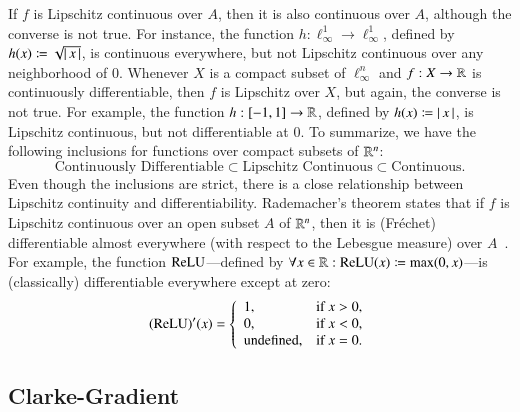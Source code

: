 \documentclass[11pt,times]{article}
\begin{document}
If $f$ is Lipschitz continuous over $A$, then it is also continuous
over $A$, although the converse is not true. For instance, the
function $h : \ell^1_\infty \to \ell^1_\infty$, defined by
$h(x) \coloneqq \sqrt{\lvert\thinspace {x} \thinspace\rvert}$, is continuous everywhere, but not
Lipschitz continuous over any neighborhood of $0$. Whenever $X$ is a
compact subset of $\ell^n_\infty$ and $f: X \to \mathbb{R}$ is continuously
differentiable, then $f$ is Lipschitz over $X$, but again, the
converse is not true. For example, the function $h: [-1,1] \to \mathbb{R}$,
defined by $h(x) \coloneqq \lvert\thinspace {x} \thinspace\rvert$, is Lipschitz continuous, but not
differentiable at $0$. To summarize, we have the following inclusions
for functions over compact subsets of $\mathbb{R}^n$:
%
\begin{equation*}
  \text{Continuously Differentiable} \subset \text{Lipschitz
    Continuous} \subset \text{Continuous}.
\end{equation*}
%
\noindent
Even though the inclusions are strict, there is a close relationship
between Lipschitz continuity and differentiability. Rademacher's
theorem states that if $f$ is Lipschitz continuous over an open subset
$A$ of $\mathbb{R}^n$, then it is (Fr{\'e}chet) differentiable almost
everywhere (with respect to the Lebesgue measure) over
$A$~\parencite[Corollary~4.19]{Clarke_et_al:Nonsmooth_Control:Book:1998}. For
example, the function $\operatorname{\mathrm{ReLU}}$---defined by
$\forall x \in \mathbb{R}: \operatorname{\mathrm{ReLU}}(x) \coloneqq \max( 0, x)$---is (classically)
differentiable everywhere except at zero:
%
\begin{equation*}
  (\operatorname{\mathrm{ReLU}})'(x) =
  \left\{
    \begin{array}{ll}
      1, & \text{if } x > 0, \\
      0, & \text{if } x < 0, \\
      \mathrm{undefined}, & \text{if } x = 0.
    \end{array}
  \right.
\end{equation*}


\subsection{Clarke-Gradient}
\end{document}
